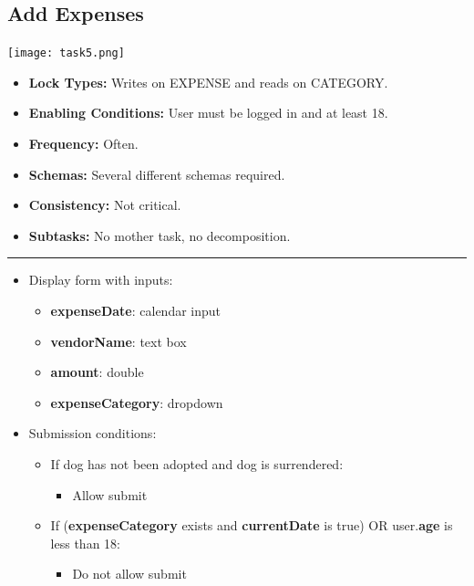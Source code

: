 \documentclass{article}
\begin{document}
\subsection{Add Expenses}
\begin{center}
    \texttt{[image: task5.png]}
\end{center}
\begin{itemize}
    \item \textbf{Lock Types:} Writes on EXPENSE and reads on CATEGORY.
    \item \textbf{Enabling Conditions:} User must be logged in and at least 18.
    \item \textbf{Frequency:} Often.
    \item \textbf{Schemas:} Several different schemas required.
    \item \textbf{Consistency:} Not critical.
    \item \textbf{Subtasks:} No mother task, no decomposition.
\end{itemize}
\noindent\rule{8cm}{0.4pt}
\begin{itemize}
    \item Display form with inputs:
    \begin{itemize}
        \item \textbf{expenseDate}: calendar input
        \item \textbf{vendorName}: text box
        \item \textbf{amount}: double
        \item \textbf{expenseCategory}: dropdown
    \end{itemize}
    \item Submission conditions:
    \begin{itemize}
        \item If dog has not been adopted and dog is surrendered:
        \begin{itemize}
            \item Allow submit
        \end{itemize}
        \item If (\textbf{expenseCategory} exists and \textbf{currentDate} is true) OR user.\textbf{age} is less than 18:
        \begin{itemize}
            \item Do not allow submit
        \end{itemize}
    \end{itemize}
\end{itemize}
\end{document}
